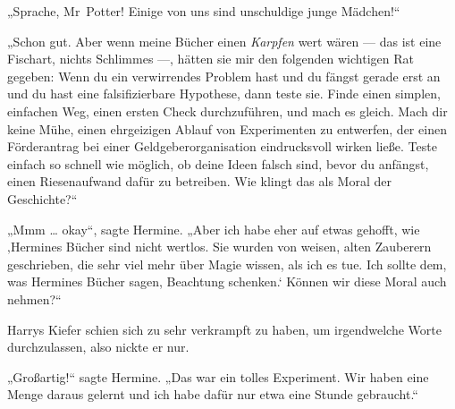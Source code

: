 „Sprache, Mr~Potter! Einige von uns sind unschuldige junge Mädchen!“

„Schon gut. Aber wenn meine Bücher einen \emph{Karpfen} wert wären — das ist eine Fischart, nichts Schlimmes —, hätten sie mir den folgenden wichtigen Rat gegeben: Wenn du ein verwirrendes Problem hast und du fängst gerade erst an und du hast eine falsifizierbare Hypothese, dann teste sie. Finde einen simplen, einfachen Weg, einen ersten Check durchzuführen, und mach es gleich. Mach dir keine Mühe, einen ehrgeizigen Ablauf von Experimenten zu entwerfen, der einen Förderantrag bei einer Geldgeberorganisation eindrucksvoll wirken ließe. Teste einfach so schnell wie möglich, ob deine Ideen falsch sind, bevor du anfängst, einen Riesenaufwand dafür zu betreiben. Wie klingt das als Moral der Geschichte?“

„Mmm … okay“, sagte Hermine.
„Aber ich habe eher auf etwas gehofft, wie ‚Hermines Bücher sind nicht wertlos. Sie wurden von weisen, alten Zauberern geschrieben, die sehr viel mehr über Magie wissen, als ich es tue. Ich sollte dem, was Hermines Bücher sagen, Beachtung schenken.‘ Können wir diese Moral auch nehmen?“

Harrys Kiefer schien sich zu sehr verkrampft zu haben, um irgendwelche Worte durchzulassen, also nickte er nur.

„Großartig!“ sagte Hermine.
„Das war ein tolles Experiment. Wir haben eine Menge daraus gelernt und ich habe dafür nur etwa eine Stunde gebraucht.“

